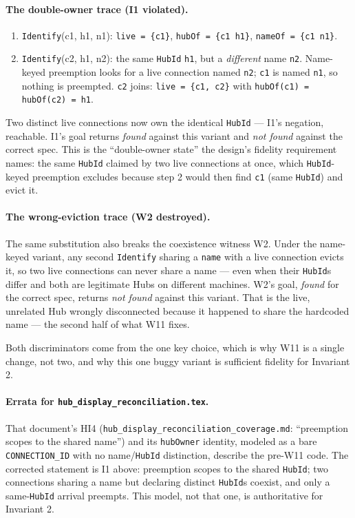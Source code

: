 \documentclass[a4paper,10pt,fleqn]{article}
\begin{document}
\paragraph{The double-owner trace (I1 violated).}
\begin{enumerate}
  \item \texttt{Identify}(c1, h1, n1): \texttt{live = \{c1\}},
    \texttt{hubOf = \{c1 \mapsto h1\}}, \texttt{nameOf = \{c1 \mapsto n1\}}.
  \item \texttt{Identify}(c2, h1, n2): the same \texttt{HubId} \texttt{h1},
    but a \emph{different} name \texttt{n2}.  Name-keyed preemption looks
    for a live connection named \texttt{n2}; \texttt{c1} is named
    \texttt{n1}, so nothing is preempted.  \texttt{c2} joins:
    \texttt{live = \{c1, c2\}} with \texttt{hubOf(c1) = hubOf(c2) = h1}.
\end{enumerate}
Two distinct live connections now own the identical \texttt{HubId} ---
I1's negation, reachable.  I1's goal returns \emph{found} against this
variant and \emph{not found} against the correct spec.  This is the
``double-owner state'' the design's fidelity requirement names: the same
\texttt{HubId} claimed by two live connections at once, which
\texttt{HubId}-keyed preemption excludes because step 2 would then find
\texttt{c1} (same \texttt{HubId}) and evict it.

\paragraph{The wrong-eviction trace (W2 destroyed).}
The same substitution also breaks the coexistence witness W2.  Under the
name-keyed variant, any second \texttt{Identify} sharing a \texttt{name}
with a live connection evicts it, so two live connections can never share
a name --- even when their \texttt{HubId}s differ and both are legitimate
Hubs on different machines.  W2's goal, \emph{found} for the correct spec,
returns \emph{not found} against this variant.  That is the live,
unrelated Hub wrongly disconnected because it happened to share the
hardcoded name --- the second half of what W11 fixes.

Both discriminators come from the one key choice, which is why W11 is a
single change, not two, and why this one buggy variant is sufficient
fidelity for Invariant 2.

\paragraph{Errata for \texttt{hub\_display\_reconciliation.tex}.}
That document's HI4 (\texttt{hub\_display\_reconciliation\_coverage.md}:
``preemption scopes to the shared name'') and its \texttt{hubOwner}
identity, modeled as a bare \texttt{CONNECTION\_ID} with no
name/\texttt{HubId} distinction, describe the pre-W11 code.  The corrected
statement is I1 above: preemption scopes to the shared \texttt{HubId}; two
connections sharing a name but declaring distinct \texttt{HubId}s coexist,
and only a same-\texttt{HubId} arrival preempts.  This model, not that
one, is authoritative for Invariant 2.
\end{document}
